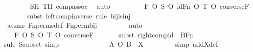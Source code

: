 \begin{isabellebody}
\ \ \ \ \ \ \isamarkupfalse%
\ SH\ TH\ comp{\isacharunderscore}{\kern0pt}assoc\ \isamarkupfalse%
\ auto\isanewline
\ \ \ \ \isamarkupfalse%
\ \isamarkupfalse%
\ {\isachardoublequoteopen}{\isachardot}{\kern0pt}{\isachardot}{\kern0pt}{\isachardot}{\kern0pt}\ {\isacharequal}{\kern0pt}\ F\ O\ {\isacharparenleft}{\kern0pt}{\isacharparenleft}{\kern0pt}S\ O\ {\isacharparenleft}{\kern0pt}id{\isacharparenleft}{\kern0pt}Fn{\isacharparenright}{\kern0pt}{\isacharparenright}{\kern0pt}{\isacharparenright}{\kern0pt}\ O\ T{\isacharparenright}{\kern0pt}\ O\ converse{\isacharparenleft}{\kern0pt}F{\isacharparenright}{\kern0pt}{\isachardoublequoteclose}\isanewline
\ \ \ \ \ \ \isamarkupfalse%
{\isacharparenleft}{\kern0pt}subst\ left{\isacharunderscore}{\kern0pt}comp{\isacharunderscore}{\kern0pt}inverse{\isacharcomma}{\kern0pt}\ rule\ bij{\isacharunderscore}{\kern0pt}is{\isacharunderscore}{\kern0pt}inj{\isacharparenright}{\kern0pt}\isanewline
\ \ \ \ \ \ \isamarkupfalse%
\ assms\ Fn{\isacharunderscore}{\kern0pt}perms{\isacharunderscore}{\kern0pt}def\ Fn{\isacharunderscore}{\kern0pt}perm{\isacharprime}{\kern0pt}{\isacharunderscore}{\kern0pt}bij\ \isanewline
\ \ \ \ \ \ \isamarkupfalse%
\ auto\isanewline
\ \ \ \ \isamarkupfalse%
\ \isamarkupfalse%
\ {\isachardoublequoteopen}{\isachardot}{\kern0pt}{\isachardot}{\kern0pt}{\isachardot}{\kern0pt}\ {\isacharequal}{\kern0pt}\ F\ O\ {\isacharparenleft}{\kern0pt}S\ O\ T{\isacharparenright}{\kern0pt}\ O\ converse{\isacharparenleft}{\kern0pt}F{\isacharparenright}{\kern0pt}{\isachardoublequoteclose}\isanewline
\ \ \ \ \ \ \isamarkupfalse%
{\isacharparenleft}{\kern0pt}subst\ right{\isacharunderscore}{\kern0pt}comp{\isacharunderscore}{\kern0pt}id\ {\isacharbrackleft}{\kern0pt}\ B{\isacharequal}{\kern0pt}Fn{\isacharbrackright}{\kern0pt}{\isacharparenright}{\kern0pt}\isanewline
\ \ \ \ \ \ \ \isamarkupfalse%
{\isacharparenleft}{\kern0pt}rule\ Ssubset{\isacharcomma}{\kern0pt}\ simp{\isacharparenright}{\kern0pt}\isanewline
\ \ \ \ \ \ \isamarkupfalse%
\isanewline
\ \ \ \ \isamarkupfalse%
\ \isamarkupfalse%
\ {\isachardoublequoteopen}A\ O\ B\ {\isasymin}\ X{\isachardoublequoteclose}\ \isanewline
\ \ \ \ \ \ \isamarkupfalse%
\ {\isacharparenleft}{\kern0pt}simp\ add{\isacharcolon}{\kern0pt}X{\isacharunderscore}{\kern0pt}def{\isacharparenright}{\kern0pt}\isanewline
\ \ \ \ \ \ \isamarkupfalse%

\end{isabellebody}
